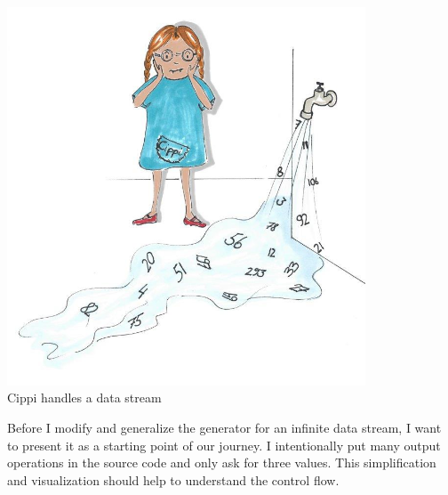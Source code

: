 \begin{center}
\includegraphics[width=0.8\textwidth]{content/3/chapter7/images/13.png}\\
Cippi handles a data stream
\end{center}

Before I modify and generalize the generator for an infinite data stream, I want to present it as a starting point of our journey. I intentionally put many output operations in the source code and only ask for three values. This simplification and visualization should help to understand the control flow.


